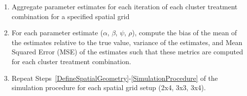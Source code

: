 \documentclass{article}[11pt]
\begin{document}
\begin{enumerate}
\begin{enumerate}
        \item Estimate and retain parameter values for $\alpha, \beta, \psi, \text{ and } \rho$ with the Spatial simultaneous autoregressive lag model (`lagsarlm()`) via maximum likelihood estimation.

        \item Iterate parts (a)-(e) of Step~\ref{SimulationProcedure} N=50 times for each cluster treatment combination for the 2x4 and 3x3 spatial grids and N=10 times for each cluster treatment combination for the 3x4 spatial grid.
    \end{enumerate}

    \item Aggregate parameter estimates for each iteration of each cluster treatment combination for a specified spatial grid

    \item For each parameter estimate ($\alpha$, $\beta$, $\psi$, $\rho$), compute the bias of the mean of the estimates relative to the true value, variance of the estimates, and Mean Squared Error (MSE) of the estimates such that these metrics are computed for each cluster treatment combination.

    \item Repeat Steps~\ref{DefineSpatialGeometry}-\ref{SimulationProcedure} of the simulation procedure for each spatial grid setup (2x4, 3x3, 3x4).
\end{enumerate}



\end{document}
